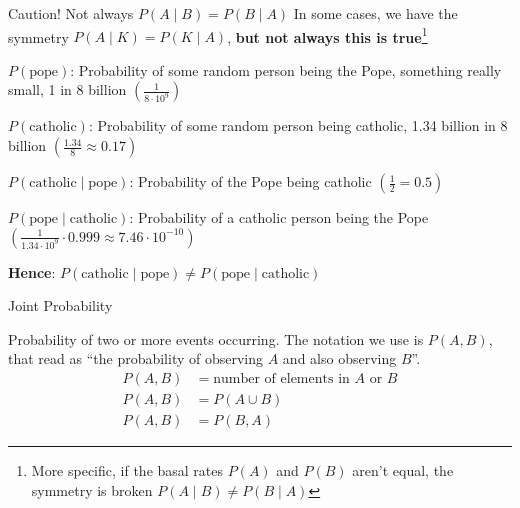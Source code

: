 \begin{frame}{Caution! Not always $P(A \mid B) = P(B \mid A)$}
	In some cases, we have the symmetry $P(A \mid K) = P(K \mid A)$,
	\textbf{but not always this is true}\footnote{
		More specific, if the basal rates $P(A)$ and $P(B)$ aren't equal,
		the symmetry is broken $P(A \mid B) \neq P(B \mid A)$}
	\begin{example}
		\begin{vfilleditems}
			\small{
				\item $P(\text{pope})$:
				Probability of some random person being the Pope,
				something really small, 1 in 8 billion $\left( \frac{1}{8 \cdot 10^9} \right)$
				\item $P(\text{catholic})$:
				Probability of some random person being catholic,
				1.34 billion in 8 billion $\left( \frac{1.34}{8} \approx 0.17 \right)$
				\item $P(\text{catholic} \mid \text{pope})$:
				Probability of the Pope being catholic $\left( \frac{1}{2} = 0.5 \right)$
				\item $P(\text{pope} \mid \text{catholic})$:
				Probability of a catholic person being the Pope $\left( \frac{1}{1.34 \cdot 10^9} \cdot 0.999 \approx 7.46 \cdot 10^{-10} \right)$
			}
			\item \large{\textbf{Hence}: $P(\text{catholic} \mid \text{pope}) \neq P(\text{pope} \mid \text{catholic})$}
		\end{vfilleditems}
	\end{example}
\end{frame}

\begin{frame}{Joint Probability}
	\begin{defn}
		Probability of two or more events occurring. \newline \newline
		The notation we use is $P(A, B)$, that read as
		``the probability of observing $A$ and also observing $B$''. \newline \newline
		$$
			\begin{aligned}
				P(A,B) & = \text{number of elements in $A$ or $B$} \\
				P(A,B) & = P(A \cup B)                             \\
				P(A,B) & = P(B,A)
			\end{aligned}
		$$
	\end{defn}
\end{frame}

